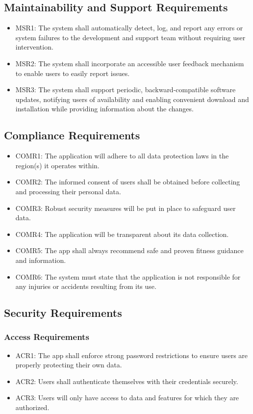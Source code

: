 \documentclass[12pt]{article}
\begin{document}
\subsection{Maintainability and Support Requirements}
\begin{itemize}
\item MSR1: The system shall automatically detect, log, and report any errors or system failures to the development and support team without requiring user intervention.
\item MSR2: The system shall incorporate an accessible user feedback mechanism to enable users to easily report issues.
\item MSR3: The system shall support periodic, backward-compatible software updates, notifying users of availability and enabling convenient download and installation while providing information about the changes.
\end{itemize}

\subsection{Compliance Requirements}
\begin{itemize}
\item COMR1: The application will adhere to all data protection laws in the region(s) it operates within.
\item COMR2: The informed consent of users shall be obtained before collecting and processing their personal data.
\item COMR3: Robust security measures will be put in place to safeguard user data.
\item COMR4: The application will be transparent about its data collection.
\item COMR5: The app shall always recommend safe and proven fitness guidance and information.
\item COMR6: The system must state that the application is not responsible for any injuries or accidents resulting from its use.
\end{itemize}

\subsection{Security Requirements}
\subsubsection{Access Requirements}
\begin{itemize}
    \item ACR1: The app shall enforce strong password restrictions to ensure users are properly protecting their own data.
    \item ACR2: Users shall authenticate themselves with their credentials securely.
    \item ACR3: Users will only have access to data and features for which they are authorized.
\end{itemize}
\end{document}
